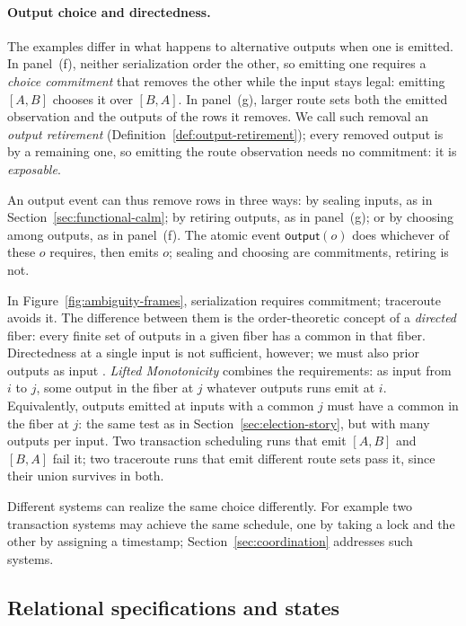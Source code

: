 \paragraph{Output choice and directedness.} The examples differ in what happens
to alternative outputs when one is emitted.  In panel~(f), neither
serialization order \outrel the other, so emitting one requires a
\emph{choice commitment} that removes the other while the input stays legal:
emitting $[A,B]$ chooses it over $[B,A]$.  In panel~(g), larger route sets \outrelbase both the
emitted observation and the outputs of the rows it removes.  We call such
removal an \emph{output retirement}
(Definition~\ref{def:output-retirement}); every removed output is
\outrelpast by a remaining one, so emitting the route observation needs no
commitment: it is \emph{exposable}.  

An output event can thus remove rows in three ways: by sealing inputs, as in
Section~\ref{sec:functional-calm}; by retiring outputs, as in panel~(g); or by
choosing among outputs, as in panel~(f).  The atomic event
$\mathsf{output}(o)$ does whichever of these $o$ requires, then emits $o$;
sealing and choosing are commitments, retiring is not.

In Figure~\ref{fig:ambiguity-frames}, serialization requires commitment; traceroute avoids it.
The difference between them is the order-theoretic concept of a \emph{directed} fiber:
every finite set of outputs in a given fiber has a common \outnoun in that fiber.
Directedness at a single input is not sufficient, however;
we must also \outrelbase prior outputs as input \ingrows. \emph{Lifted Monotonicity}
combines the requirements: as input \ingrows from $i$ to $j$, some output
in the fiber at $j$ \outrel whatever outputs runs emit at $i$.  Equivalently,
outputs emitted at inputs with a common \indesc $j$ must have a common
\outnoun in the fiber at $j$: the same test as in Section~\ref{sec:election-story}, but
with many outputs per input.  Two transaction scheduling runs that emit $[A,B]$ and $[B,A]$ fail it;
two traceroute runs that emit different route sets pass it, since their union
survives in both.

Different systems can realize the same choice differently. For example two transaction systems 
may achieve the same schedule, one by
taking a lock and the other by assigning a timestamp; Section~\ref{sec:coordination} addresses
such systems.

\subsection{Relational specifications and states}
\label{sec:relational-specifications}

